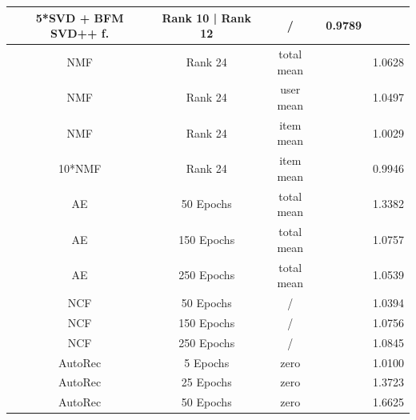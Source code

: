 \documentclass[10pt,conference,compsocconf]{IEEEtran}
\begin{document}
\begin{table}
{\begin{tabular}{|| c | c | c | c | c ||}
            5*SVD + BFM SVD++ f. & Rank 10 | Rank 12                     & /                       & 0.9789                 &                         \\
            \hline
            NMF                  & Rank 24                               & total mean              &                        & 1.0628                  \\
            NMF                  & Rank 24                               & user mean               &                        & 1.0497                  \\
            NMF                  & Rank 24                               & item mean               &                        & 1.0029                  \\
            10*NMF               & Rank 24                               & item mean               &                        & 0.9946                  \\
            \hline
            AE                   & 50 Epochs                             & total mean              &                        & 1.3382                  \\
            AE                   & 150 Epochs                            & total mean              &                        & 1.0757                  \\
            AE                   & 250 Epochs                            & total mean              &                        & 1.0539                  \\
            \hline
            NCF                  & 50 Epochs                             & /                       &                        & 1.0394                  \\
            NCF                  & 150 Epochs                            & /                       &                        & 1.0756                  \\
            NCF                  & 250 Epochs                            & /                       &                        & 1.0845                  \\
            \hline
            AutoRec              & 5 Epochs                              & zero                    &                        & 1.0100                  \\
            AutoRec              & 25 Epochs                             & zero                    &                        & 1.3723                  \\
            AutoRec              & 50 Epochs                             & zero                    &                        & 1.6625                  \\

\end{tabular}}
\end{table}
\end{document}
